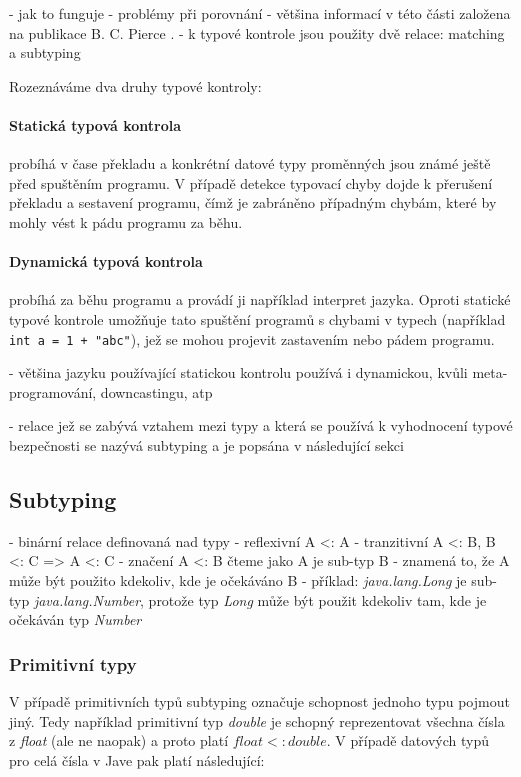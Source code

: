 \documentclass[czech,DP]{thesiskiv}
\begin{document}
- jak to funguje
- problémy při porovnání
- většina informací v této části založena na publikace B. C. Pierce \cite{pierce2002}.
- k typové kontrole jsou použity dvě relace: matching a subtyping

Rozeznáváme dva druhy typové kontroly:

\paragraph{Statická typová kontrola} probíhá v čase překladu a konkrétní datové typy proměnných jsou známé ještě před spuštěním programu. V případě detekce typovací chyby dojde k přerušení překladu a sestavení programu, čímž je zabráněno případným chybám, které by mohly vést k pádu programu za běhu.

\paragraph{Dynamická typová kontrola} probíhá za běhu programu a provádí ji například interpret jazyka. Oproti statické typové kontrole umožňuje tato spuštění programů s chybami v typech (například \verb|int a = 1 + "abc"|), jež se mohou projevit zastavením nebo pádem programu.

- většina jazyku používající statickou kontrolu používá i dynamickou, kvůli meta-programování, downcastingu, atp

- relace jež se zabývá vztahem mezi typy a která se používá k vyhodnocení typové bezpečnosti se nazývá subtyping a je popsána v následující sekci



\subsection{Subtyping}
\label{sec:subtyping}

- binární relace definovaná nad typy
- reflexivní A <: A
- tranzitivní A <: B, B <: C => A <: C
- značení A <: B čteme jako A je sub-typ B
- znamená to, že A může být použito kdekoliv, kde je očekáváno B
- příklad: \textit{java.lang.Long} je sub-typ \textit{java.lang.Number}, protože typ \textit{Long} může být použit kdekoliv tam, kde je očekáván typ \textit{Number} 

\subsubsection{Primitivní typy}

V případě primitivních typů subtyping označuje schopnost jednoho typu pojmout jiný. Tedy například primitivní typ \textit{double} je schopný reprezentovat všechna čísla z \textit{float} (ale ne naopak) a proto platí $float <: double$. V případě datových typů pro celá čísla v Jave pak platí následující:
\end{document}
